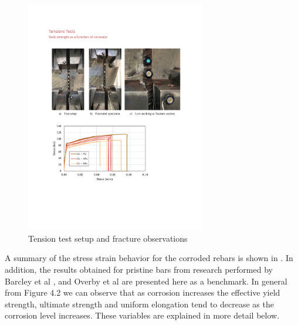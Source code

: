 \begin{figure}[htbp]
	\centering
	\includegraphics[width=0.7\textwidth]{VAC Thesis 2.0/Chapter-4/figs/TensionTest_images.pdf}
	\caption{Tension test setup and fracture observations}
	\label{fig:TensionTest_NoNecking}
\end{figure}

A summary of the stress strain behavior for the corroded rebars is shown in . In addition, the results obtained for pristine bars from research performed by Barcley et al \cite{Barcley2018}, and Overby et al \cite{Overby2016} are presented here as a benchmark. In general from Figure 4.2 we can observe that as corrosion increases the effective yield strength, ultimate strength and uniform elongation tend to decrease as the corrosion level increases.  These variables are explained in more detail below.

